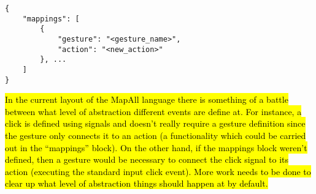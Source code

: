 \documentclass{article}
\begin{document}
\begin{Verbatim}[baselinestretch=1.0]
{
    "mappings": [
        {
            "gesture": "<gesture_name>",
            "action": "<new_action>"
        }, ...
    ]
}
\end{Verbatim}

\hl{In the current layout of the MapAll language there is something of a battle between what level of abstraction different events are define at.
For instance, a click is defined using signals and doesn't really require a gesture definition since the gesture only connects it to an action (a functionality which could be carried out in the ``mappings'' block). On the other hand, if the mappings block weren't defined, then a gesture would be necessary to connect the click signal to its action (executing the standard input click event). More work needs to be done to clear up what level of abstraction things should happen at by default.}


 
\end{document}
